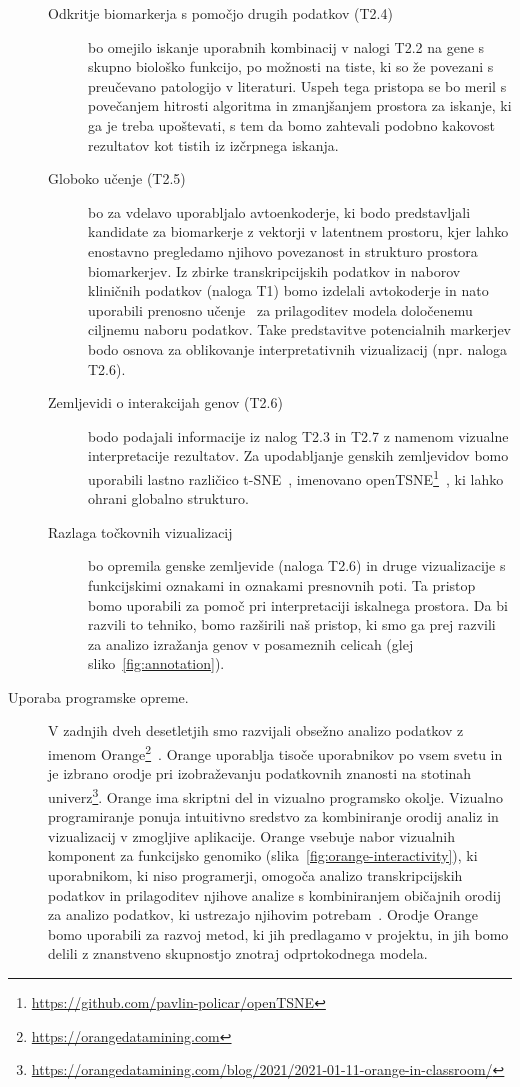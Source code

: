 \documentclass[11pt,a4paper]{article}
\newcommand{\myurl}[1]{\footnote{\url{#1}}}
\begin{document}
\begin{description}
\begin{description}
		\item[Odkritje biomarkerja s pomočjo drugih podatkov (T2.4)] bo omejilo iskanje uporabnih kombinacij v nalogi T2.2 na gene s skupno biološko funkcijo, po možnosti na tiste, ki so že povezani s preučevano patologijo v literaturi. Uspeh tega pristopa se bo meril s povečanjem hitrosti algoritma in zmanjšanjem prostora za iskanje, ki ga je treba upoštevati, s tem da bomo zahtevali podobno kakovost rezultatov kot tistih iz izčrpnega iskanja.
		\item[Globoko učenje (T2.5)] bo za vdelavo uporabljalo avtoenkoderje, ki bodo predstavljali kandidate za biomarkerje z vektorji v latentnem prostoru, kjer lahko enostavno pregledamo njihovo povezanost in strukturo prostora biomarkerjev. Iz zbirke transkripcijskih podatkov in naborov kliničnih podatkov (naloga T1) bomo izdelali avtokoderje in nato uporabili prenosno učenje~\cite{Godec2019} za prilagoditev modela določenemu ciljnemu naboru podatkov. Take predstavitve potencialnih markerjev bodo osnova za oblikovanje interpretativnih vizualizacij (npr. naloga T2.6).
		\item[Zemljevidi o interakcijah genov (T2.6)] bodo podajali informacije iz nalog T2.3 in T2.7 z namenom vizualne interpretacije rezultatov. Za upodabljanje genskih zemljevidov bomo uporabili lastno različico t-SNE~\cite{vanDerMaaten2008}, imenovano openTSNE\myurl{https://github.com/pavlin-policar/openTSNE}~\cite{policar2019}, ki lahko ohrani globalno strukturo.
		\item[Razlaga točkovnih vizualizacij] bo opremila genske zemljevide (naloga T2.6) in druge vizualizacije s funkcijskimi oznakami in oznakami presnovnih poti. Ta pristop bomo uporabili za pomoč pri interpretaciji iskalnega prostora. Da bi razvili to tehniko, bomo razširili naš pristop, ki smo ga prej razvili za analizo izražanja genov v posameznih celicah (glej sliko~\ref{fig:annotation}).
	\end{description}

	\item[Uporaba programske opreme.] V zadnjih dveh desetletjih smo razvijali obsežno analizo podatkov z imenom Orange\myurl{https://orangedatamining.com}~\cite{Demsar2013,Curk2005,Godec2019}. Orange uporablja tisoče uporabnikov po vsem svetu in je izbrano orodje pri izobraževanju podatkovnih znanosti na stotinah univerz\myurl{https://orangedatamining.com/blog/2021/2021-01-11-orange-in-classroom/}. Orange ima skriptni del in vizualno programsko okolje. Vizualno programiranje ponuja intuitivno sredstvo za kombiniranje orodij analiz in vizualizacij v zmogljive aplikacije. Orange vsebuje nabor vizualnih komponent za funkcijsko genomiko (slika~\ref{fig:orange-interactivity}), ki uporabnikom, ki niso programerji, omogoča analizo transkripcijskih podatkov in prilagoditev njihove analize s kombiniranjem običajnih orodij za analizo podatkov, ki ustrezajo njihovim potrebam~\cite{Godec2019}. Orodje Orange bomo uporabili za razvoj metod, ki jih predlagamo v projektu, in jih bomo delili z znanstveno skupnostjo znotraj odprtokodnega modela.


\end{description}
\end{document}
